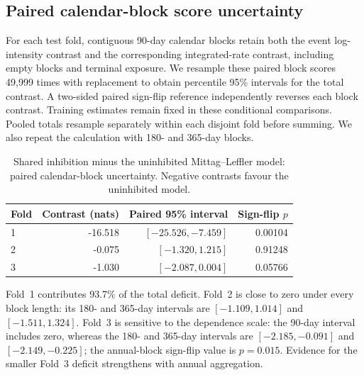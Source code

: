 \subsection{Paired calendar-block score uncertainty}
\label{sec:block_score_uncertainty}
For each test fold, contiguous 90-day calendar blocks retain both the event
log-intensity contrast and the corresponding integrated-rate contrast,
including empty blocks and terminal exposure. We resample these paired block
scores 49,999 times with replacement to obtain percentile 95\% intervals for
the total contrast. A two-sided paired sign-flip reference independently
reverses each block contrast. Training estimates remain fixed in these
conditional comparisons. Pooled totals resample separately within each disjoint
fold before summing. We also repeat the calculation with 180- and 365-day blocks.

\begin{table}[htbp]
\centering
\begin{tabular}{lrrr}
\toprule
Fold & Contrast (nats) & Paired 95\% interval & Sign-flip $p$ \\
\midrule
1 & -16.518 & $[-25.526,-7.459]$ & 0.00104 \\
2 & -0.075 & $[-1.320,1.215]$ & 0.91248 \\
3 & -1.030 & $[-2.087,0.004]$ & 0.05766 \\
\bottomrule
\end{tabular}
\caption{Shared inhibition minus the uninhibited Mittag--Leffler model: paired calendar-block uncertainty. Negative contrasts favour the uninhibited model.}
\label{tab:nz_score_uncertainty}
\end{table}

Fold~1 contributes 93.7\% of the total deficit. Fold~2 is close to zero under every block length: its 180- and 365-day intervals are $[-1.109,1.014]$ and $[-1.511,1.324]$. Fold~3 is sensitive to the dependence scale: the 90-day interval includes zero, whereas the 180- and 365-day intervals are $[-2.185,-0.091]$ and $[-2.149,-0.225]$; the annual-block sign-flip value is $p=0.015$. Evidence for the smaller Fold~3 deficit strengthens with annual aggregation.
